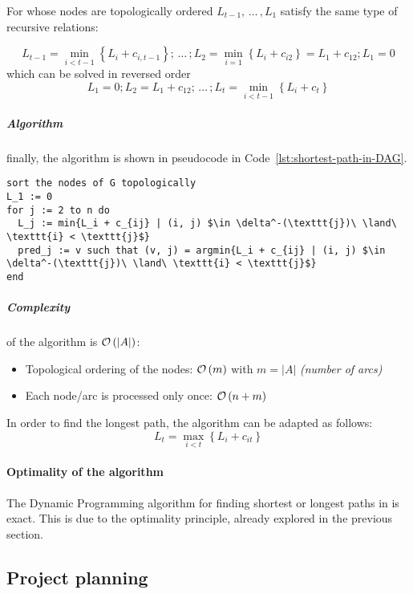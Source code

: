 \documentclass[english]{article}
\begin{document}
For \DAGs whose nodes are topologically ordered \(L_{t-1}, \, \ldots \,, L_1\) satisfy the same type of recursive relations:

\[ L_{t-1} = \displaystyle \min_{i < t-1} \left\{ L_i + c_{i, t-1} \right\}; \, \ldots \,; L_2 = \displaystyle \min_{i=1}\left\{ L_i + c_{i2} \right\} = L_1 + c_{12}; L_1 = 0 \]
which can be solved in reversed order
\[ L_1 = 0; L_2 = L_1 + c_{12}; \, \ldots \,; L_{t} = \displaystyle \min_{i < t - 1} \left\{ L_i + c_t \right\} \]

\subparagraph*{Algorithm}
finally, the algorithm is shown in pseudocode in Code~\ref{lst:shortest-path-in-DAG}.

\begin{lstlisting}[caption={Shortest path in \DAG}, label={lst:shortest-path-in-DAG}, float]
sort the nodes of G topologically
L_1 := 0
for j := 2 to n do
  L_j := min{L_i + c_{ij} | (i, j) $\in \delta^-(\texttt{j})\ \land\ \texttt{i} < \texttt{j}$}
  pred_j := v such that (v, j) = argmin{L_i + c_{ij} | (i, j) $\in \delta^-(\texttt{j})\ \land\ \texttt{i} < \texttt{j}$}
end
\end{lstlisting}

\subparagraph*{Complexity}
of the algorithm is \(\mathcal{O}\left(|A|\right)\):

\begin{itemize}
  \item Topological ordering of the nodes: \(\mathcal{O}\left(m\right)\) with \(m = |A|\) \textit{(number of arcs)}
  \item Each node/arc is processed only once: \(\mathcal{O}\left(n+m\right)\)
\end{itemize}

\bigskip
In order to find the longest path, the algorithm can be adapted as follows:
\[L_t = \displaystyle \max_{i < t} \left\{ L_i + c_{it} \right\}\]

\paragraph{Optimality of the algorithm}

The Dynamic Programming algorithm for finding shortest or longest paths in \DAGs is exact.
This is due to the optimality principle, already explored in the previous section.

\subsection{Project planning}
\end{document}
